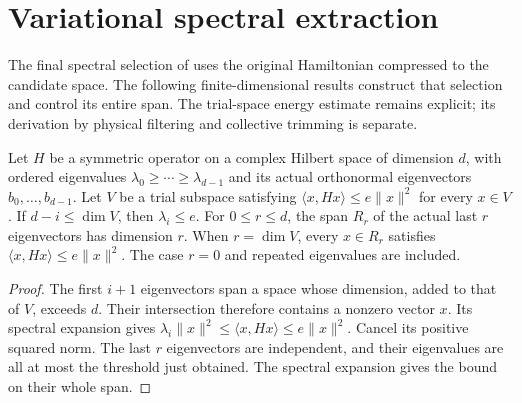 \section{Variational spectral extraction}

The final spectral selection of
\cite[Figure~\texttt{fig:algo1} and the proof of \texttt{t:alg1},
    lines 1620--1643 and 1811--1817]{Arad2016RigorousRG}
uses the original Hamiltonian compressed to the candidate space.
The following finite-dimensional results construct that selection and
control its entire span. The trial-space energy estimate remains explicit;
its derivation by physical filtering and collective trimming is separate.

\begin{lemma}
    \label{lem:ritz_trial_low_spectrum}
    \leanok
    Let $H$ be a symmetric operator on a complex Hilbert space of
    dimension $d$, with ordered eigenvalues
    $\lambda_0\ge\cdots\ge\lambda_{d-1}$ and its actual orthonormal
    eigenvectors $b_0,\ldots,b_{d-1}$. Let $V$ be a trial subspace
    satisfying $\langle x,Hx\rangle\le e\|x\|^2$ for every $x\in V$.
    If $d-i\le\dim V$, then $\lambda_i\le e$.
    For $0\le r\le d$, the span $R_r$ of the actual last $r$
    eigenvectors has dimension $r$. When $r=\dim V$, every $x\in R_r$
    satisfies $\langle x,Hx\rangle\le e\|x\|^2$.
    The case $r=0$ and repeated eigenvalues are included.
\end{lemma}
\begin{proof}\leanok
    The first $i+1$ eigenvectors span a space whose dimension, added to
    that of $V$, exceeds $d$. Their intersection therefore contains a
    nonzero vector $x$. Its spectral expansion gives
    $\lambda_i\|x\|^2\le\langle x,Hx\rangle\le e\|x\|^2$.
    Cancel its positive squared norm. The last $r$ eigenvectors are
    independent, and their eigenvalues are all at most the threshold
    just obtained. The spectral expansion gives the bound on their whole span.
\end{proof}

